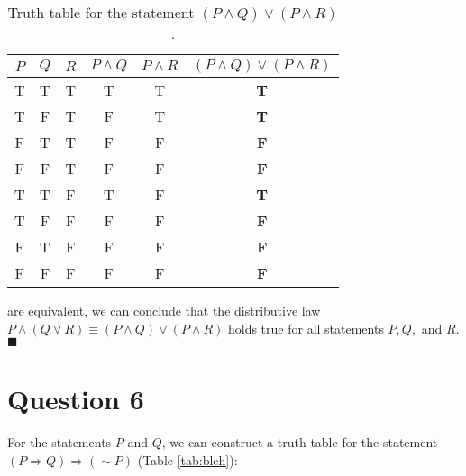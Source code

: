 \documentclass[11pt, oneside]{article}   	%
\newcommand*{\QEDA}{\hfill\ensuremath{\blacksquare}}         %
\begin{document}
\begin{table}[h]                                           %
\begin{center}
\begin{tabular}{c c c | c c || c}                                %
    $P$ & $Q$ & $R$ & $P \wedge Q$ & $P \wedge R$ & $(P \wedge Q) \vee (P \wedge R)$  \\
    \hline
    T & T & T & T & T & \textbf{T} \\
    T & F & T & F & T & \textbf{T} \\
    F & T & T & F & F & \textbf{F} \\
    F & F & T & F & F & \textbf{F} \\
    T & T & F & T & F & \textbf{T} \\
    T & F & F & F & F & \textbf{F} \\
    F & T & F & F & F & \textbf{F} \\
    F & F & F & F & F & \textbf{F} \\       					          
\end{tabular}
\end{center}

\caption{Truth table for the statement $(P \wedge Q) \vee (P \wedge R)$.}
\label{tab:RHS} 
\end{table}

are equivalent, we can conclude that the distributive law $P \wedge (Q \vee R) \equiv (P \wedge Q) \vee (P \wedge R)$ holds true for all statements $P, Q,$ and $R$. \QEDA

\cleardoublepage

\section*{Question 6}

For the statements $P$ and $Q$, we can construct a truth table for the statement $(P \Rightarrow Q) \Rightarrow (\sim P)$ (Table \ref{tab:bleh}):
\end{document}
